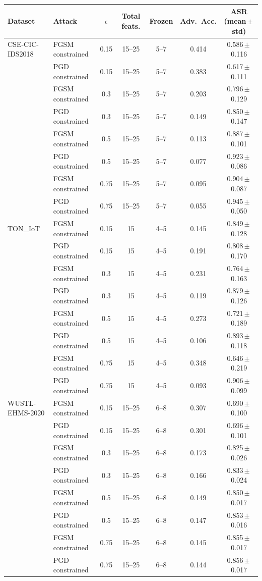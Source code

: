 \begin{tabular}{l l c c c c c}
\toprule
\textbf{Dataset} & \textbf{Attack} & $\epsilon$ & \textbf{Total feats.} & \textbf{Frozen} & \textbf{Adv.\ Acc.} & \textbf{ASR} (mean\,$\pm$\,std) \\
\midrule
CSE-CIC-IDS2018 & FGSM constrained & 0.15 & 15--25 & 5--7 & 0.414 & 0.586\,$\pm$\,0.116 \\
 & PGD constrained & 0.15 & 15--25 & 5--7 & 0.383 & 0.617\,$\pm$\,0.111 \\
 & FGSM constrained & 0.3 & 15--25 & 5--7 & 0.203 & 0.796\,$\pm$\,0.129 \\
 & PGD constrained & 0.3 & 15--25 & 5--7 & 0.149 & 0.850\,$\pm$\,0.147 \\
 & FGSM constrained & 0.5 & 15--25 & 5--7 & 0.113 & 0.887\,$\pm$\,0.101 \\
 & PGD constrained & 0.5 & 15--25 & 5--7 & 0.077 & 0.923\,$\pm$\,0.086 \\
 & FGSM constrained & 0.75 & 15--25 & 5--7 & 0.095 & 0.904\,$\pm$\,0.087 \\
 & PGD constrained & 0.75 & 15--25 & 5--7 & 0.055 & 0.945\,$\pm$\,0.050 \\
TON\_IoT & FGSM constrained & 0.15 & 15 & 4--5 & 0.145 & 0.849\,$\pm$\,0.128 \\
 & PGD constrained & 0.15 & 15 & 4--5 & 0.191 & 0.808\,$\pm$\,0.170 \\
 & FGSM constrained & 0.3 & 15 & 4--5 & 0.231 & 0.764\,$\pm$\,0.163 \\
 & PGD constrained & 0.3 & 15 & 4--5 & 0.119 & 0.879\,$\pm$\,0.126 \\
 & FGSM constrained & 0.5 & 15 & 4--5 & 0.273 & 0.721\,$\pm$\,0.189 \\
 & PGD constrained & 0.5 & 15 & 4--5 & 0.106 & 0.893\,$\pm$\,0.118 \\
 & FGSM constrained & 0.75 & 15 & 4--5 & 0.348 & 0.646\,$\pm$\,0.219 \\
 & PGD constrained & 0.75 & 15 & 4--5 & 0.093 & 0.906\,$\pm$\,0.099 \\
WUSTL-EHMS-2020 & FGSM constrained & 0.15 & 15--25 & 6--8 & 0.307 & 0.690\,$\pm$\,0.100 \\
 & PGD constrained & 0.15 & 15--25 & 6--8 & 0.301 & 0.696\,$\pm$\,0.101 \\
 & FGSM constrained & 0.3 & 15--25 & 6--8 & 0.173 & 0.825\,$\pm$\,0.026 \\
 & PGD constrained & 0.3 & 15--25 & 6--8 & 0.166 & 0.833\,$\pm$\,0.024 \\
 & FGSM constrained & 0.5 & 15--25 & 6--8 & 0.149 & 0.850\,$\pm$\,0.017 \\
 & PGD constrained & 0.5 & 15--25 & 6--8 & 0.147 & 0.853\,$\pm$\,0.016 \\
 & FGSM constrained & 0.75 & 15--25 & 6--8 & 0.145 & 0.855\,$\pm$\,0.017 \\
 & PGD constrained & 0.75 & 15--25 & 6--8 & 0.144 & 0.856\,$\pm$\,0.017 \\
\bottomrule
\end{tabular}
